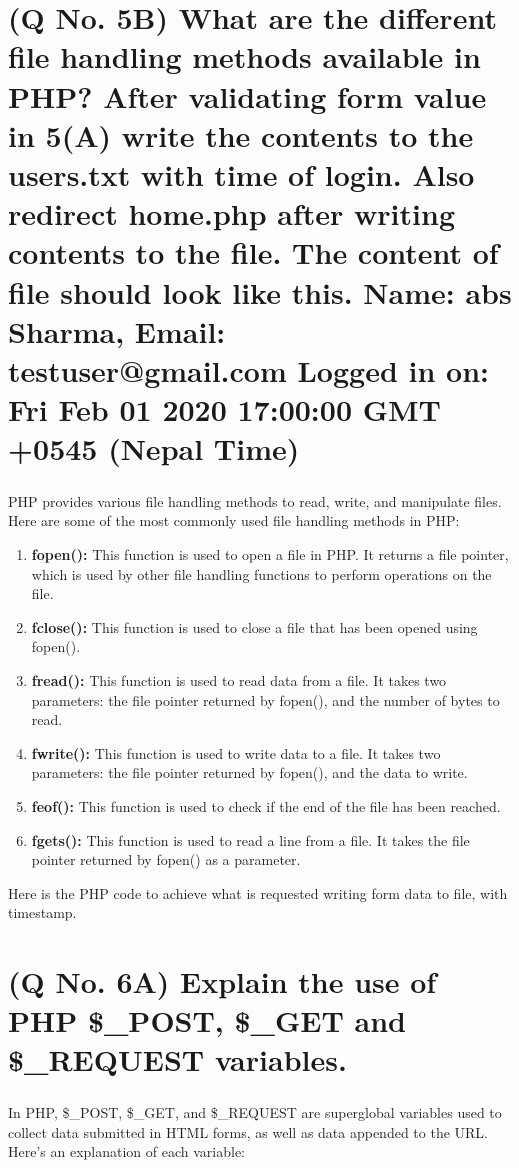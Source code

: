 \documentclass[11pt]{article}
\begin{document}
\section{(Q No. 5B) What are the different file handling methods available in PHP? After validating form value in 5(A) write the contents to the users.txt with time of login. Also redirect home.php after writing contents to the file. The content of file should look like this. 
Name: abs Sharma, Email: testuser@gmail.com Logged in on: Fri Feb 01 2020 17:00:00 GMT +0545 (Nepal Time)}
\subparagraph{}
PHP provides various file handling methods to read, write, and manipulate files. Here are some of the most commonly used file handling methods in PHP:
    \begin{enumerate}
        \item \textbf{fopen():} This function is used to open a file in PHP. It returns a file pointer, which is used by other file handling functions to perform operations on the file.

        \item \textbf{fclose():} This function is used to close a file that has been opened using fopen().
    
        \item \textbf{fread():} This function is used to read data from a file. It takes two parameters: the file pointer returned by fopen(), and the number of bytes to read.
    
        \item \textbf{fwrite():} This function is used to write data to a file. It takes two parameters: the file pointer returned by fopen(), and the data to write.
    
        \item \textbf{feof():} This function is used to check if the end of the file has been reached.
    
        \item \textbf{fgets():} This function is used to read a line from a file. It takes the file pointer returned by fopen() as a parameter.
    \end{enumerate}

    Here is the PHP code to achieve what is requested writing form data to file, with timestamp.
    


\section{(Q No. 6A) Explain the use of PHP \$\_POST, \$\_GET and \$\_REQUEST variables.}
\subparagraph{}
    In PHP, \$\_POST, \$\_GET, and \$\_REQUEST are superglobal variables used to collect data submitted in HTML forms, as well as data appended to the URL. Here's an explanation of each variable:
\end{document}
